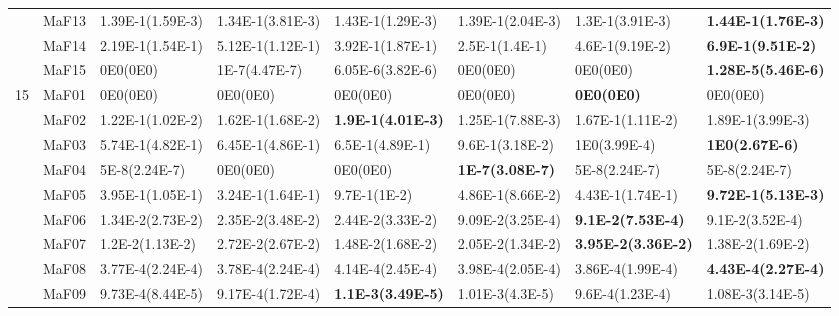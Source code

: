 \documentclass[]{article}
\begin{document}
\begin{landscape}
\begin{table}
\begin{footnotesize}
\begin{tabular}{|l|l|l|l|l|l|l|l|}
 & MaF13 & 1.39E-1(1.59E-3) & 1.34E-1(3.81E-3) & \cellcolor{gray95} 1.43E-1(1.29E-3) & 1.39E-1(2.04E-3) & 1.3E-1(3.91E-3) & \cellcolor{gray95} {\bf 1.44E-1(1.76E-3)}\\
 & MaF14 & 2.19E-1(1.54E-1) & \cellcolor{gray95} 5.12E-1(1.12E-1) & 3.92E-1(1.87E-1) & 2.5E-1(1.4E-1) & 4.6E-1(9.19E-2) & \cellcolor{gray95} {\bf 6.9E-1(9.51E-2)}\\
 & MaF15 & 0E0(0E0) & 1E-7(4.47E-7) & \cellcolor{gray95} 6.05E-6(3.82E-6) & 0E0(0E0) & 0E0(0E0) & \cellcolor{gray95} {\bf 1.28E-5(5.46E-6)}\\
\hline

\multirow{15}{*}{15} & MaF01 & \cellcolor{gray95} 0E0(0E0) & \cellcolor{gray95} 0E0(0E0) & \cellcolor{gray95} 0E0(0E0) & \cellcolor{gray95} 0E0(0E0) & \cellcolor{gray95} {\bf 0E0(0E0)} & \cellcolor{gray95} 0E0(0E0)\\
 & MaF02 & 1.22E-1(1.02E-2) & 1.62E-1(1.68E-2) & \cellcolor{gray95} {\bf 1.9E-1(4.01E-3)} & 1.25E-1(7.88E-3) & 1.67E-1(1.11E-2) & \cellcolor{gray95} 1.89E-1(3.99E-3)\\
 & MaF03 & 5.74E-1(4.82E-1) & 6.45E-1(4.86E-1) & 6.5E-1(4.89E-1) & 9.6E-1(3.18E-2) & 1E0(3.99E-4) & \cellcolor{gray95} {\bf 1E0(2.67E-6)}\\
 & MaF04 & \cellcolor{gray95} 5E-8(2.24E-7) & \cellcolor{gray95} 0E0(0E0) & \cellcolor{gray95} 0E0(0E0) & \cellcolor{gray95} {\bf 1E-7(3.08E-7)} & \cellcolor{gray95} 5E-8(2.24E-7) & \cellcolor{gray95} 5E-8(2.24E-7)\\
 & MaF05 & 3.95E-1(1.05E-1) & 3.24E-1(1.64E-1) & \cellcolor{gray95} 9.7E-1(1E-2) & 4.86E-1(8.66E-2) & 4.43E-1(1.74E-1) & \cellcolor{gray95} {\bf 9.72E-1(5.13E-3)}\\
 & MaF06 & 1.34E-2(2.73E-2) & 2.35E-2(3.48E-2) & 2.44E-2(3.33E-2) & \cellcolor{gray95} 9.09E-2(3.25E-4) & \cellcolor{gray95} {\bf 9.1E-2(7.53E-4)} & \cellcolor{gray95} 9.1E-2(3.52E-4)\\
 & MaF07 & \cellcolor{gray95} 1.2E-2(1.13E-2) & \cellcolor{gray95} 2.72E-2(2.67E-2) & \cellcolor{gray95} 1.48E-2(1.68E-2) & \cellcolor{gray95} 2.05E-2(1.34E-2) & \cellcolor{gray95} {\bf 3.95E-2(3.36E-2)} & \cellcolor{gray95} 1.38E-2(1.69E-2)\\
 & MaF08 & 3.77E-4(2.24E-4) & 3.78E-4(2.24E-4) & \cellcolor{gray95} 4.14E-4(2.45E-4) & 3.98E-4(2.05E-4) & 3.86E-4(1.99E-4) & \cellcolor{gray95} {\bf 4.43E-4(2.27E-4)}\\
 & MaF09 & 9.73E-4(8.44E-5) & 9.17E-4(1.72E-4) & \cellcolor{gray95} {\bf 1.1E-3(3.49E-5)} & 1.01E-3(4.3E-5) & 9.6E-4(1.23E-4) & \cellcolor{gray95} 1.08E-3(3.14E-5)\\

\end{tabular}
\end{footnotesize}
\end{table}
\end{landscape}
\end{document}
